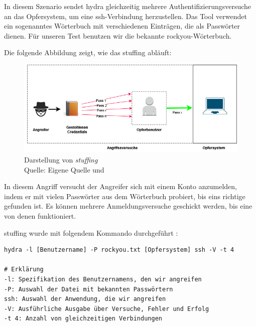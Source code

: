 In diesem Szenario sendet \gls{hydra} gleichzeitig mehrere Authentifizierungsversuche an das Opfersystem, um eine \gls{ssh}-Verbindung herzustellen. Das Tool verwendet ein sogenanntes Wörterbuch mit verschiedenen Einträgen, die als Passwörter dienen. Für unseren Test benutzen wir die bekannte \gls{rockyou}-Wörterbuch.

Die folgende Abbildung zeigt, wie das \gls{stuffing} abläuft:

\begin{figure}[H]
   \centering
   \includegraphics[width=1\textwidth]{assets/Stuffing.jpg}
   \caption[Darstellung von \textit{\gls{stuffing}}]
   {Darstellung von \textit{\gls{stuffing}}\\Quelle: Eigene Quelle und \citep{Nguyen_stuffing}}
   \centering
\end{figure}

In diesem Angriff versucht der Angreifer sich mit einem Konto anzumelden, indem er mit vielen Passwörter aus dem Wörterbuch probiert, bis eins richtige gefunden ist. Es können mehrere Anmeldungsversuche geschickt werden, bis eine von denen funktioniert.

\newpage
\gls{stuffing} wurde mit folgendem Kommando durchgeführt \citep{kali_hydra}:
{
\begin{Verbatim}[frame=single]
hydra -l [Benutzername] -P rockyou.txt [Opfersystem] ssh -V -t 4

# Erklärung
-l: Spezifikation des Benutzernamens, den wir angreifen
-P: Auswahl der Datei mit bekannten Passwörtern
ssh: Auswahl der Anwendung, die wir angreifen
-V: Ausführliche Ausgabe über Versuche, Fehler und Erfolg
-t 4: Anzahl von gleichzeitigen Verbindungen
\end{Verbatim}
}

